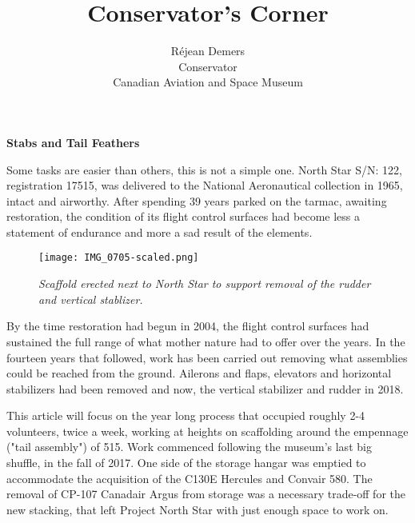 %


\title{Conservator's Corner}
\author{R\'{e}jean Demers\\ Conservator\\ Canadian Aviation and Space Museum}

\maketitle

\textbf{Stabs and Tail Feathers}

Some tasks are easier than others, this is not a simple one. North Star S/N:
122, registration 17515, was delivered to the National Aeronautical collection
in 1965, intact and airworthy. After spending 39 years parked on the tarmac,
awaiting restoration, the condition of its flight control surfaces had become
less a statement of endurance and more a sad result of the elements. 

\begin{figure}[httb]
   \vspace{2em}
   \centering
   \texttt{[image: IMG\_0705-scaled.png]}
   \caption*{\small \em Scaffold erected next to North Star to support removal of the rudder and vertical stablizer.}
   \label{fig:stab-one}
\end{figure}

By the time restoration had begun in 2004, the flight control surfaces had
sustained the full range of what mother nature had to offer over the years. In
the fourteen years that followed, work has been carried out removing what
assemblies could be reached from the ground. Ailerons and flaps, elevators and
horizontal stabilizers had been removed and now, the vertical stabilizer and
rudder in 2018. 

This article will focus on the year long process that occupied roughly 2-4
volunteers, twice a week, working at heights on scaffolding around the empennage
("tail assembly") of 515. Work commenced following the museum's last big
shuffle, in the fall of 2017. One side of the storage hangar was emptied to
accommodate the acquisition of the C130E Hercules and Convair 580. The removal
of CP-107 Canadair Argus from storage was a necessary trade-off for the new
stacking, that left Project North Star with just enough space to work on.


